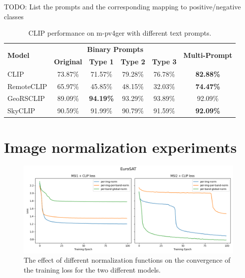 \documentclass[a4paper, oneside, english]{sapthesis}
\begin{document}
TODO: List the prompts and the corresponding mapping to positive/negative classes


\begin{table}[ht]
\centering
\footnotesize
\renewcommand{\arraystretch}{1.2} %
    \begin{tabular}{lc|cccc}
    \toprule
    \multirow{2}{*}{\textbf{Model}} & \multicolumn{4}{c}{\textbf{Binary Prompts}} &  \multirow{2}{*}{\textbf{Multi-Prompt}}\\
    \cmidrule(lr){2-5}
    & \textbf{Original} & \textbf{Type 1} & \textbf{Type 2} & \textbf{Type 3} \\
    \midrule
    CLIP & 73.87\% & 71.57\% & 79.28\% & 76.78\% & \textbf{82.88\%} \\
    RemoteCLIP & 65.97\% & 45.85\% & 48.15\% & 32.03\% & \textbf{74.47\%} \\
    GeoRSCLIP & 89.09\% & \textbf{94.19\%} & 93.29\% & 93.89\% & 92.09\% \\
    SkyCLIP & 90.59\% & 91.99\% & 90.79\% & 91.59\% & \textbf{92.09\%} \\
    \bottomrule
    \end{tabular}
\vspace{0.3cm}
\caption{\normalsize CLIP performance on m-pv4ger with different text prompts.}
\label{tab:prompts2}
\end{table}


\section{Image normalization experiments}

\begin{figure}[h]
    \centering
    \includegraphics[width=\textwidth]{img/EuroSAT_norm_losses_plot.png}
    \caption{The effect of different normalization functions on the convergence of the training loss for the two different models.}
    \label{fig:normlosses}
\end{figure}
\end{document}
